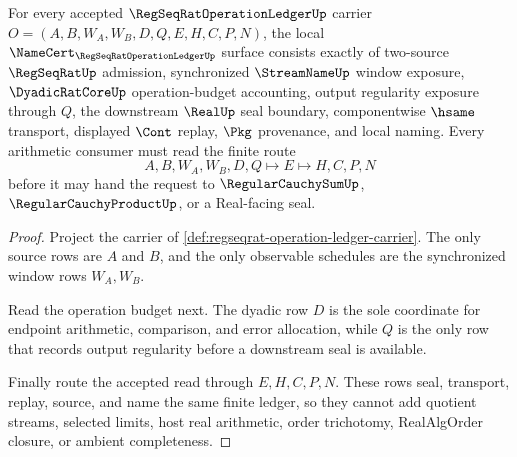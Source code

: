 \begin{theorem}
\label{thm:regseqrat-operation-ledger-namecert-obligations}
For every accepted $\RegSeqRatOperationLedgerUp$ carrier $O=(A,B,W_A,W_B,D,Q,E,H,C,P,N)$, the local $\NameCert_{\RegSeqRatOperationLedgerUp}$ surface consists exactly of two-source $\RegSeqRatUp$ admission, synchronized $\StreamNameUp$ window exposure, $\DyadicRatCoreUp$ operation-budget accounting, output regularity exposure through $Q$, the downstream $\RealUp$ seal boundary, componentwise $\hsame$ transport, displayed $\Cont$ replay, $\Pkg$ provenance, and local naming. Every arithmetic consumer must read the finite route
$$
A,B,W_A,W_B,D,Q \longmapsto E \longmapsto H,C,P,N
$$
before it may hand the request to $\RegularCauchySumUp$, $\RegularCauchyProductUp$, or a Real-facing seal.
\end{theorem}
\begin{proof}
Project the carrier of \autoref{def:regseqrat-operation-ledger-carrier}. The only source rows are $A$ and $B$, and the only observable schedules are the synchronized window rows $W_A,W_B$.

Read the operation budget next. The dyadic row $D$ is the sole coordinate for endpoint arithmetic, comparison, and error allocation, while $Q$ is the only row that records output regularity before a downstream seal is available.

Finally route the accepted read through $E,H,C,P,N$. These rows seal, transport, replay, source, and name the same finite ledger, so they cannot add quotient streams, selected limits, host real arithmetic, order trichotomy, RealAlgOrder closure, or ambient completeness.
\end{proof}

